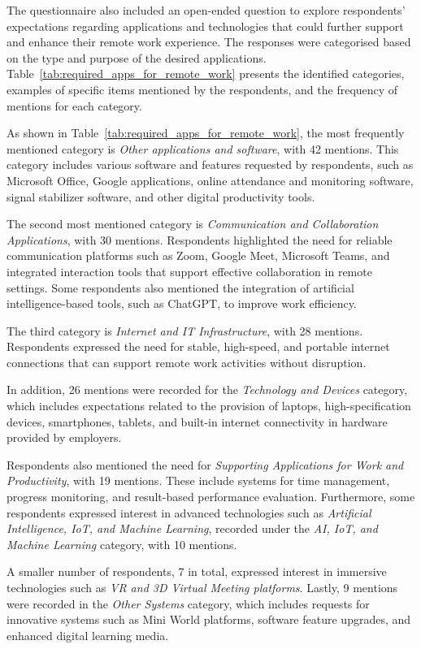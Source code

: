 \documentclass[a4paper, conference]{IEEEtran}
\begin{document}
The questionnaire also included an open-ended question to explore respondents' expectations regarding applications and technologies that could further support and enhance their remote work experience. The responses were categorised based on the type and purpose of the desired applications. Table~\ref{tab:required_apps_for_remote_work} presents the identified categories, examples of specific items mentioned by the respondents, and the frequency of mentions for each category.

As shown in Table~\ref{tab:required_apps_for_remote_work}, the most frequently mentioned category is \textit{Other applications and software}, with 42 mentions. This category includes various software and features requested by respondents, such as Microsoft Office, Google applications, online attendance and monitoring software, signal stabilizer software, and other digital productivity tools.

The second most mentioned category is \textit{Communication and Collaboration Applications}, with 30 mentions. Respondents highlighted the need for reliable communication platforms such as Zoom, Google Meet, Microsoft Teams, and integrated interaction tools that support effective collaboration in remote settings. Some respondents also mentioned the integration of artificial intelligence-based tools, such as ChatGPT, to improve work efficiency.

The third category is \textit{Internet and IT Infrastructure}, with 28 mentions. Respondents expressed the need for stable, high-speed, and portable internet connections that can support remote work activities without disruption.

In addition, 26 mentions were recorded for the \textit{Technology and Devices} category, which includes expectations related to the provision of laptops, high-specification devices, smartphones, tablets, and built-in internet connectivity in hardware provided by employers.

Respondents also mentioned the need for \textit{Supporting Applications for Work and Productivity}, with 19 mentions. These include systems for time management, progress monitoring, and result-based performance evaluation. Furthermore, some respondents expressed interest in advanced technologies such as \textit{Artificial Intelligence, IoT, and Machine Learning}, recorded under the \textit{AI, IoT, and Machine Learning} category, with 10 mentions.

A smaller number of respondents, 7 in total, expressed interest in immersive technologies such as \textit{VR and 3D Virtual Meeting platforms}. Lastly, 9 mentions were recorded in the \textit{Other Systems} category, which includes requests for innovative systems such as Mini World platforms, software feature upgrades, and enhanced digital learning media.
\end{document}

